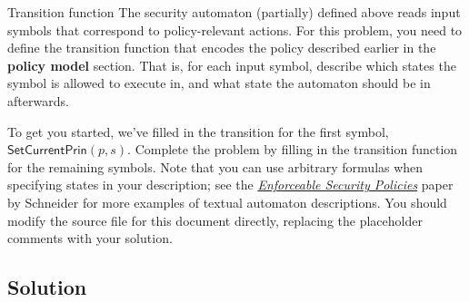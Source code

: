 \documentclass[11pt]{article}
\begin{document}
\newpage
\begin{problem}{Transition function}
The security automaton (partially) defined above reads input symbols that correspond to policy-relevant actions. For this problem, you need to define the transition function that encodes the policy described earlier in the \textbf{policy model} section. That is, for each input symbol, describe which states the symbol is allowed to execute in, and what state the automaton should be in afterwards. 

To get you started, we've filled in the transition for the first symbol, $\mathsf{SetCurrentPrin}(p, s)$. Complete the problem by filling in the transition function for the remaining symbols. Note that you can use arbitrary formulas when specifying states in your description; see the \href{https://www.cs.cornell.edu/fbs/publications/EnfSecPols.pdf}{\emph{Enforceable Security Policies}} paper by Schneider for more examples of textual automaton descriptions. You should modify the source file for this document directly, replacing the placeholder comments with your solution.

\subsection*{Solution}


\end{problem}
\end{document}
